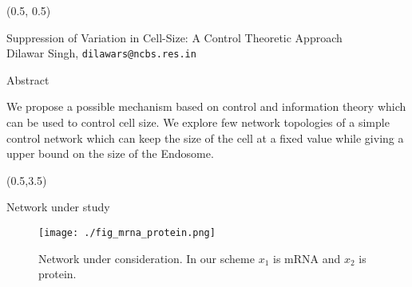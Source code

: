 \documentclass{beamer}
\begin{document}
\begin{textblock}{15}(0.5, 0.5)
    \begin{block}{}
        \centering
        \Large Suppression of Variation in Cell-Size: A Control Theoretic Approach \\
        \large Dilawar Singh, \texttt{dilawars@ncbs.res.in}
    \end{block}
    \begin{block}{Abstract}

        We propose a  possible mechanism based on control and information theory
        which can be used to control cell size. We explore few network
        topologies of a simple control network which can keep the size of the
        cell at a fixed value while giving a upper bound on the size of the
        Endosome.

\end{block}
\end{textblock}

\begin{textblock}{7}(0.5,3.5)

    \begin{block}{Network under study}
        \begin{figure}
            \texttt{[image: ./fig\_mrna\_protein.png]}

        \caption{Network under consideration. In our scheme $x_1$ is mRNA and $x_2$ is protein.}
        \label{fig:demon}
        \end{figure}
    
        \begin{equation}
        \end{equation}


    \end{block}

\end{textblock}
\end{document}

